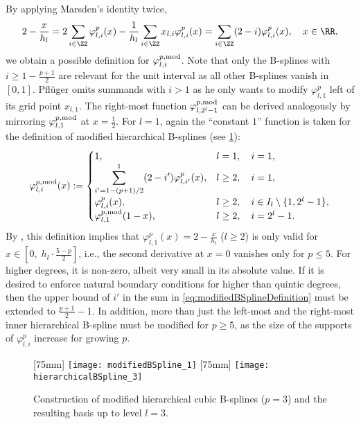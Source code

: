 By applying Marsden's identity twice,
\begin{equation}
  \label{eq:modifiedBSplineConstruction}
  2 - \frac{x}{h_l}
  = 2 \sum_{i \in \ZZ} \varphi_{l,i}^p(x)
  - \frac{1}{h_l} \sum_{i \in \ZZ} x_{l,i} \varphi_{l,i}^p(x)
  = \sum_{i \in \ZZ} (2 - i) \varphi_{l,i}^p(x),\quad
  x \in \RR,
\end{equation}
we obtain a possible definition for $\varphi_{l,i}^{p,\mathrm{mod}}$.
Note that only the B-splines with $i \ge 1 - \tfrac{p+1}{2}$
are relevant for the unit interval as all other B-splines vanish in $[0, 1]$.
Pflüger omits summands with $i > 1$ as he only wants to modify
$\varphi_{l,1}^p$ left of its grid point $x_{l,1}$.
The right-most function $\varphi_{l,2^l-1}^{p,\mathrm{mod}}$ can be derived
analogously by mirroring $\varphi_{l,1}^{p,\mathrm{mod}}$ at $x = \tfrac{1}{2}$.
For $l = 1$, again the ``constant $1$'' function is taken for the definition
of modified hierarchical B-splines (see \cref{fig:modifiedBSpline}):
\begin{equation}
  \label{eq:modifiedBSplineDefinition}
  \varphi_{l,i}^{p,\mathrm{mod}}(x)
  :=
  \begin{cases}
    1,&
    l = 1,\quad i = 1,\\
    \displaystyle\sum_{i'=1-(p+1)/2}^1 (2 - i') \varphi_{l,i'}^p(x),&
    l \ge 2,\quad i = 1,\\
    \varphi_{l,i}^p(x),&
    l \ge 2,\quad i \in I_l \setminus \{1, 2^l - 1\},\\
    \varphi_{l,1}^{p,\mathrm{mod}}(1 - x),&
    l \ge 2,\quad i = 2^l - 1.
  \end{cases}
\end{equation}
By ,
this definition implies that
$\varphi_{l,1}^p(x) = 2 - \tfrac{x}{h_l}$ ($l \ge 2$)
is only valid for $x \in [0,\; h_l \cdot \tfrac{5-p}{2}]$, i.e.,
the second derivative at $x = 0$ vanishes only for $p \le 5$.
For higher degrees, it is non-zero, albeit very small
in its absolute value.
If it is desired to enforce natural boundary conditions
for higher than quintic degrees,
then the upper bound of $i'$ in the sum in \eqref{eq:modifiedBSplineDefinition}
must be extended to $\tfrac{p+1}{2} - 1$.
In addition, more than just the left-most and the right-most inner
hierarchical B-spline must be modified for $p \ge 5$,
as the size of the supports of $\varphi_{l,i}^p$ increase
for growing $p$.

\begin{figure}
  [75mm]{%
    \texttt{[image: modifiedBSpline\_1]}%
  }%
  \hfill%
  [75mm]{%
    \texttt{[image: hierarchicalBSpline\_3]}%
  }%
  \caption{%
    Construction of modified hierarchical cubic B-splines ($p = 3$) and
    the resulting basis up to level $l = 3$.%
  }
  \label{fig:modifiedBSpline}
\end{figure}



